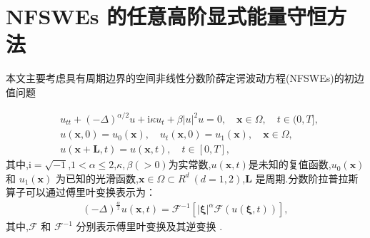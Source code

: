 \chapter[NFSWEs 的任意高阶显式能量守恒方法]{NFSWEs 的任意高阶显式能量守恒方法
}

本文主要考虑具有周期边界的空间非线性分数阶薛定谔波动方程(NFSWEs)的初边值问题

\begin{align}
&  u_{t t}+(-\Delta)^{\alpha / 2} u+\mathrm{i} \kappa u_{t}+\beta|u|^{2} u=0, \quad \boldsymbol{x} \in \Omega, \quad  t \in(0, T],\label{eq_SAVRRK:1}\\
& u(\boldsymbol{x}, 0)=u_{0}(\boldsymbol{x}), \quad u_{t}(\boldsymbol{x}, 0)=u_{1}(\boldsymbol{x}),\quad \boldsymbol{x} \in \Omega, \label{eq_SAVRRK:2}\\
& u(\boldsymbol{x}+\boldsymbol{L}, t)=u(\boldsymbol{x}, t), \quad t \in[0, T],\label{eq_SAVRRK:3}
\end{align}
其中,$\mathrm{i}=\sqrt{-1}$,$1<\alpha \leq 2$,$\kappa, \beta(>0)$为实常数,$u(\boldsymbol{x}, t)$是未知的复值函数,$u_{0}(\boldsymbol{x})$ 和 $u_{1}(\boldsymbol{x})$ 为已知的光滑函数,$\boldsymbol{x}\in\Omega\!\subset\!
R^d~(d\!=\!1,2)$,$\boldsymbol{L}$ 是周期.分数阶拉普拉斯算子可以通过傅里叶变换表示为：
\begin{align}\label{eq_SAVRRK:4}
(-\Delta)^{\frac{\alpha}{2}} u(\boldsymbol{x},t)=\mathcal{F}^{-1}\left[|\boldsymbol{\xi}|^{\alpha} \mathcal{F}(u(\boldsymbol{\xi},t))\right],
\end{align}
其中,$\mathcal{F}$ 和 $\mathcal{F}^{-1}$ 分别表示傅里叶变换及其逆变换 \cite{caffarelliExtensionProblemRelated2007}.


